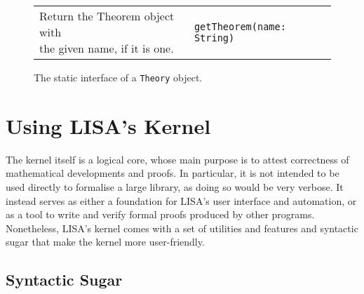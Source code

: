 {\begin{figure}[hp]
\begin{center}
\begin{tabular}{l|l}
            \makecell[l]{Return the Theorem object with   \\the given name, if it is one.} &
            \begin{lstlisting}
getTheorem(name: String)
\end{lstlisting}
            \\ %
          \end{tabular}
          \caption{The static interface of a \lstinline|Theory|{} object.}
          \label{fig:theorygetters}
        \end{center}
      \end{figure}

    \fi
  }

\section{Using LISA's Kernel}
\label{sec:kernelHelpers}
The kernel itself is a logical core, whose main purpose is to attest correctness of mathematical developments and proofs. In particular, it is not intended to be used directly to formalise a large library, as doing so would be very verbose. It instead serves as either a foundation for LISA's user interface and automation, or as a tool to write and verify formal proofs produced by other programs.
Nonetheless, LISA's kernel comes with a set of utilities and features and syntactic sugar that make the kernel more user-friendly.
\subsection{Syntactic Sugar}

